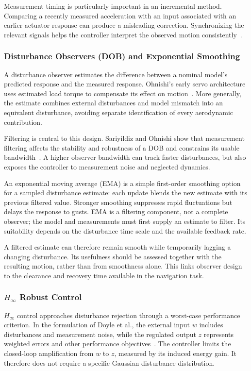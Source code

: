 Measurement timing is particularly important in an incremental method. Comparing a recently measured acceleration with an input associated with an earlier actuator response can produce a misleading correction. Synchronizing the relevant signals helps the controller interpret the observed motion consistently~\cite{litINDI2016}.

\FloatBarrier
\subsubsection{Disturbance Observers (DOB) and Exponential Smoothing}
A disturbance observer estimates the difference between a nominal model's predicted response and the measured response. Ohnishi's early servo architecture uses estimated load torque to compensate its effect on motion~\cite{litDOB1987}. More generally, the estimate combines external disturbances and model mismatch into an equivalent disturbance, avoiding separate identification of every aerodynamic contribution.

Filtering is central to this design. Sariyildiz and Ohnishi show that measurement filtering affects the stability and robustness of a DOB and constrains its usable bandwidth~\cite{litDOB2015}. A higher observer bandwidth can track faster disturbances, but also exposes the controller to measurement noise and neglected dynamics.

An exponential moving average (EMA) is a simple first-order smoothing option for a sampled disturbance estimate: each update blends the new estimate with its previous filtered value. Stronger smoothing suppresses rapid fluctuations but delays the response to gusts. EMA is a filtering component, not a complete observer; the model and measurements must first supply an estimate to filter. Its suitability depends on the disturbance time scale and the available feedback rate.

A filtered estimate can therefore remain smooth while temporarily lagging a changing disturbance. Its usefulness should be assessed together with the resulting motion, rather than from smoothness alone. This links observer design to the clearance and recovery time available in the navigation task.

\FloatBarrier
\subsubsection{\texorpdfstring{$H_\infty$}{H-infinity} Robust Control}
$H_\infty$ control approaches disturbance rejection through a worst-case performance criterion. In the formulation of Doyle et al., the external input $w$ includes disturbances and measurement noise, while the regulated output $z$ represents weighted errors and other performance objectives~\cite{litHinf1989}. The controller limits the closed-loop amplification from $w$ to $z$, measured by its induced energy gain. It therefore does not require a specific Gaussian disturbance distribution.

